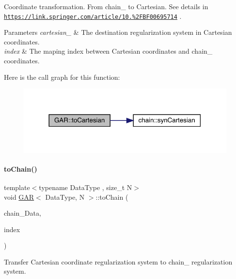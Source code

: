 Coordinate transformation. From chain_ to Cartesian. See details in \href{https://link.springer.com/article/10.1007%2FBF00695714}{\tt https\+://link.\+springer.\+com/article/10.\%2\+F\+B\+F00695714} .
\begin{DoxyParams}{Parameters}
{\em cartesian_} & The destination regularization system in Cartesian coordinates. \\
\hline
{\em index} & The maping index between Cartesian coordinates and chain_ coordinates. \\
\hline
\end{DoxyParams}
Here is the call graph for this function\+:\nopagebreak
\begin{figure}[H]
\begin{center}
\leavevmode
\includegraphics[width=314pt]{class_g_a_r_a2a282218e90ffb1a367da364b70e54a3_cgraph}
\end{center}
\end{figure}
\mbox{\label{class_g_a_r_a18041ac48dc47e6ada3e8a33893b1200}} 
\paragraph{\texorpdfstring{to\+Chain()}{toChain()}}
{\footnotesize\ttfamily template$<$typename Data\+Type , size\+\_\+t N$>$ \\
void \mbox{\hyperlink{class_g_a_r}{G\+AR}}$<$ Data\+Type, N $>$\+::to\+Chain (\begin{DoxyParamCaption}\item[{\mbox{\hyperlink{class_g_a_r}{G\+AR}}$<$ Data\+Type, N $>$ \&}]{chain_\+Data,  }\item[{\mbox{\hyperlink{class_g_a_r_aaf033049c0cd8f0f86a82b9595086fa5}{Index\+Array}} \&}]{index }\end{DoxyParamCaption})\hspace{0.3cm}{\ttfamily [inline]}}



Transfer Cartesian coordinate regularization system to chain_ regularization system.

